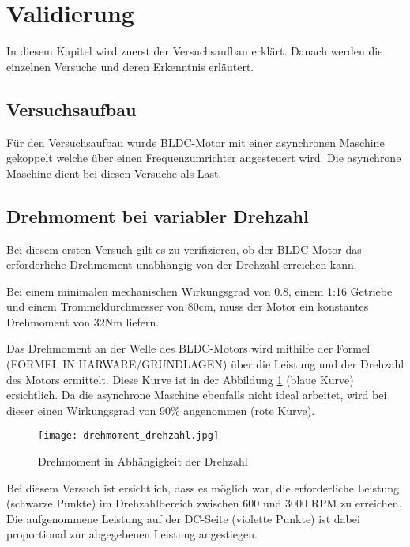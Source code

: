 \section{Validierung}\label{sec:Validierung}
In diesem Kapitel wird zuerst der Versuchsaufbau erklärt. Danach werden die einzelnen Versuche und deren Erkenntnis erläutert.

\subsection{Versuchsaufbau}\label{subsec:Versuchsaufbau}
Für den Versuchsaufbau wurde BLDC-Motor mit einer asynchronen Maschine gekoppelt welche über einen Frequenzumrichter angesteuert wird. Die asynchrone Maschine dient bei diesen Versuche als Last.


\subsection{Drehmoment bei variabler Drehzahl}\label{subsec:DrehmomentDrehzahl}
Bei diesem ersten Versuch gilt es zu verifizieren, ob der BLDC-Motor das erforderliche Drehmoment unabhängig von der Drehzahl erreichen kann.

Bei einem minimalen mechanischen Wirkungsgrad von 0.8, einem 1:16 Getriebe und einem Trommeldurchmesser von 80cm, muss der Motor ein konstantes Drehmoment von 32Nm liefern.

Das Drehmoment an der Welle des BLDC-Motors wird mithilfe der Formel (FORMEL IN HARWARE/GRUNDLAGEN) über die Leistung und der Drehzahl des Motors ermittelt. Diese Kurve ist in der Abbildung \ref{fig:drehmoment/drehzahl} (blaue Kurve) ersichtlich. Da die asynchrone Maschine ebenfalls nicht ideal arbeitet, wird bei dieser einen Wirkungsgrad von 90\% angenommen (rote Kurve). 

\begin{figure}[H]
	\centering
	\texttt{[image: drehmoment\_drehzahl.jpg]}
	\caption{Drehmoment in Abhängigkeit der Drehzahl}\label{fig:drehmoment/drehzahl}
\end{figure}

Bei diesem Versuch ist ersichtlich, dass es möglich war, die erforderliche Leistung (schwarze Punkte) im Drehzahlbereich zwischen 600 und 3000 RPM zu erreichen. Die aufgenommene Leistung auf der DC-Seite (violette Punkte) ist dabei proportional zur abgegebenen Leistung angestiegen.

